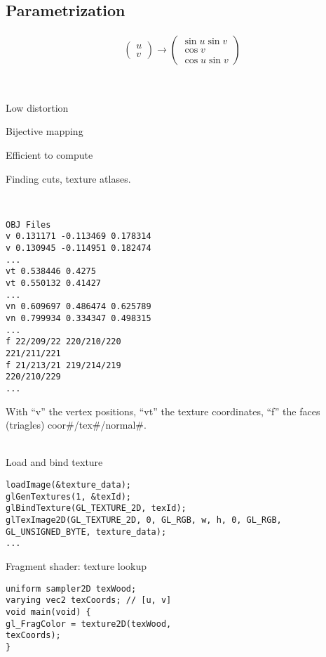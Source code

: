 \begin{compactdesc}
\section{Parametrization}
	\item[\lp{sphere}] 
		\begin{gather*}
			\!\left(\!\begin{smallmatrix}
				u\\
				v
			\end{smallmatrix}\!\right)\!
			\to
			\!\left(\!\begin{smallmatrix}
				\sin u\sin v\\
				\cos v\\
				\cos u \sin v
			\end{smallmatrix}\!\right)\!
		\end{gather*}
	\item[\lp{Desirable properties}]\hfill\\
		\begin{enumerate*}[label=\protect\circled{\arabic*},itemjoin=]
			\item Low distortion\\
			\item Bijective mapping\\
			\item Efficient to compute
		\end{enumerate*}
	\item[\lp{Issues}] Finding cuts, texture atlases.
	\item[\lp{OBJ files}]\hfill\\
		\begin{lstlisting}
OBJ Files
v 0.131171 -0.113469 0.178314
v 0.130945 -0.114951 0.182474
...
vt 0.538446 0.4275
vt 0.550132 0.41427
...
vn 0.609697 0.486474 0.625789
vn 0.799934 0.334347 0.498315
...
f 22/209/22 220/210/220
221/211/221
f 21/213/21 219/214/219
220/210/229
...
		\end{lstlisting}
		With ``v'' the vertex positions, ``vt'' the texture coordinates, ``f'' the faces (triagles) coor\#/tex\#/normal\#.
	\item[\lp{OpenGL}]\hfill\\
		Load and bind texture
		\begin{lstlisting}
loadImage(&texture_data);
glGenTextures(1, &texId);
glBindTexture(GL_TEXTURE_2D, texId);
glTexImage2D(GL_TEXTURE_2D, 0, GL_RGB, w, h, 0, GL_RGB, GL_UNSIGNED_BYTE, texture_data);
...
		\end{lstlisting}
		Fragment shader: texture lookup
		\begin{lstlisting}
uniform sampler2D texWood;
varying vec2 texCoords; // [u, v]
void main(void) {
gl_FragColor = texture2D(texWood,
texCoords);
}	
		\end{lstlisting}

\end{compactdesc}
